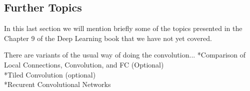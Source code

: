\documentclass[]{article}
\begin{document}
\subsection{Further Topics}
In this last section we will mention briefly some of the topics presented in the
Chapter 9 of the Deep Learning book that we have not yet covered.

There are variants of the usual way of doing the convolution...
\newline
*Comparison of Local Connections, Convolution, and FC (Optional)\\
*Tiled Convolution (optional)\\
*Recurent Convolutional Networks







\end{document}
